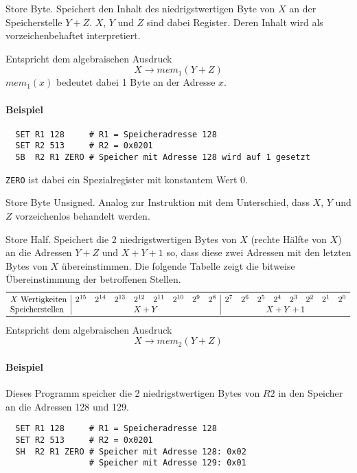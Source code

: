 \glqq Store Byte\grqq.
Speichert den Inhalt des niedrigstwertigen Byte von $X$ an der Speicherstelle
$Y + Z$. $X$, $Y$ und $Z$ sind dabei Register. Deren Inhalt wird als
vorzeichenbehaftet interpretiert.

Entspricht dem algebraischen Ausdruck
\[
    X \to mem_{1} (Y + Z)
\]
$mem_{1}(x)$ bedeutet dabei 1 Byte an der Adresse $x$.

\paragraph{Beispiel}
\begin{lstlisting}
  SET R1 128     # R1 = Speicheradresse 128
  SET R2 513     # R2 = 0x0201
  SB  R2 R1 ZERO # Speicher mit Adresse 128 wird auf 1 gesetzt
\end{lstlisting}
\texttt{ZERO} ist dabei ein Spezialregister mit konstantem Wert $0$.


\glqq Store Byte Unsigned\grqq.
Analog zur Instruktion  mit dem Unterschied, dass $X$, $Y$ und $Z$
vorzeichenlos behandelt werden.



\glqq Store Half\grqq.
Speichert die 2 niedrigstwertigen Bytes von $X$ (rechte Hälfte von $X$) an die
Adressen $Y + Z$ und $X + Y + 1$ so, dass diese zwei Adressen mit den letzten
Bytes von $X$ übereinstimmen. Die folgende Tabelle zeigt die bitweise
Übereinstimmung der betroffenen Stellen.
\[
  \begin{array}{l|*{8}{c}|*{8}{c}}
   \toprule
   X \text{ Wertigkeiten} &
   2^{15} & 2^{14} & 2^{13} & 2^{12} & 2^{11} & 2^{10} & 2^{9} & 2^{8} & 
   2^{7} & 2^{6} & 2^{5} & 2^{4} & 2^{3} & 2^{2} & 2^{1} & 2^{0}
   \\
   \text{Speicherstellen} &
   \multicolumn{8}{c|}{X + Y} &
   \multicolumn{8}{c}{X + Y + 1}
   \\\bottomrule
  \end{array}
\]
Entspricht dem algebraischen Ausdruck
\[
  X \to mem_{2} (Y + Z)
\]

\paragraph{Beispiel} Dieses Programm speicher die 2 niedrigstwertigen Bytes von
$R2$ in den Speicher an die Adressen 128 und 129.
\begin{lstlisting}
  SET R1 128     # R1 = Speicheradresse 128
  SET R2 513     # R2 = 0x0201
  SH  R2 R1 ZERO # Speicher mit Adresse 128: 0x02
                 # Speicher mit Adresse 129: 0x01
\end{lstlisting}



